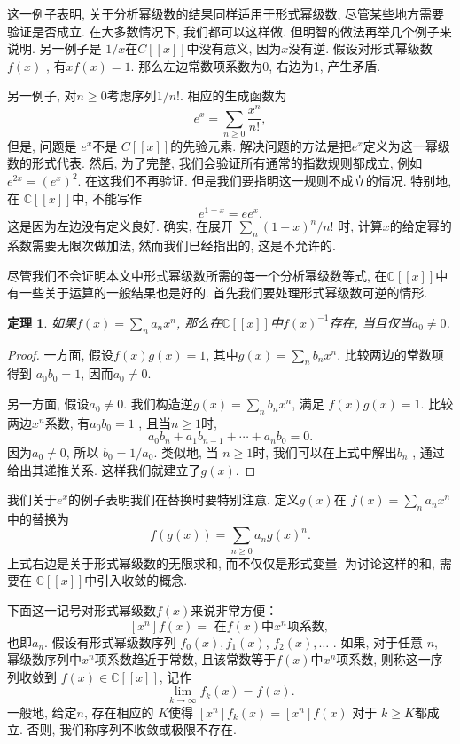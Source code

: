 \documentclass[a4paper,12pt]{ctexbook}
\newtheorem{theorem}[lemma]{\hspace{2em}定理}%
\begin{document}
这一例子表明, 关于分析幂级数的结果同样适用于形式幂级数, 尽管某些地方需要验证是否成立. 在大多数情况下, 我们都可以这样做. 但明智的做法再举几个例子来说明. 另一例子是 $1 / x$在$C[[x]]$中没有意义, 因为$x$没有逆. 假设对形式幂级数$f(x)$ , 有$x f(x)=1$. 那么左边常数项系数为0, 右边为1, 产生矛盾.

另一例子, 对$n \geq 0$考虑序列$1 / n !$. 相应的生成函数为
$$
e^{x}=\sum_{n \geq 0} \frac{x^{n}}{n !},
$$
但是, 问题是 $e^{x}$不是 $C[[x]]$的先验元素. 解决问题的方法是把$e^{x}$定义为这一幂级数的形式代表. 然后, 为了完整, 我们会验证所有通常的指数规则都成立, 例如 $e^{2 x}=\left(e^{x}\right)^{2}$. 在这我们不再验证. 但是我们要指明这一规则不成立的情况. 特别地, 在 $\mathbb{C}[[x]]$中, 不能写作
$$
e^{1+x}=e e^{x} .
$$
这是因为左边没有定义良好. 确实, 在展开 $\sum_{n}(1+x)^{n} / n !$ 时, 计算$x$的给定幂的系数需要无限次做加法, 然而我们已经指出的, 这是不允许的.

尽管我们不会证明本文中形式幂级数所需的每一个分析幂级数等式, 在$\mathbb{C}[[x]]$中有一些关于运算的一般结果也是好的. 首先我们要处理形式幂级数可逆的情形.

\begin{theorem}
	如果$f(x)=\sum_{n} a_{n} x^{n}$, 那么在$\mathbb{C}[[x]]$中$f(x)^{-1}$存在, 当且仅当$a_{0} \neq 0$.
\end{theorem}
\begin{proof}
	一方面, 假设$f(x) g(x)=1$, 其中$g(x)=\sum_{n} b_{n} x^{n} $. 比较两边的常数项得到 $a_{0} b_{0}=1$, 因而$a_{0} \neq 0$.

	另一方面, 假设$a_{0} \neq 0$. 我们构造逆$g(x)=\sum_{n} b_{n} x^{n}$, 满足 $f(x) g(x)=1$. 比较两边$x^{n}$系数, 有$a_{0} b_{0}=1$ , 且当$n \geq 1$时,
	$$
	a_{0} b_{n}+a_{1} b_{n-1}+\cdots+a_{n} b_{0}=0.
	$$
	因为$a_{0} \neq 0$, 所以 $b_{0}=1 / a_{0}$. 类似地, 当 $n \geq 1$时, 我们可以在上式中解出$b_{n}$ , 通过给出其递推关系. 这样我们就建立了$g(x)$.

\end{proof}

我们关于$e^{x}$的例子表明我们在替换时要特别注意. 定义$g(x)$在 $f(x)=\sum_{n} a_{n} x^{n}$中的{\kaishu 替换}为
$$
f(g(x))=\sum_{n \geq 0} a_{n} g(x)^{n} .
$$
上式右边是关于形式幂级数的无限求和, 而不仅仅是形式变量. 为讨论这样的和, 需要在 $\mathbb{C}[[x]]$中引入收敛的概念.

下面这一记号对形式幂级数$f(x)$来说非常方便：
$$
\left[x^{n}\right] f(x)=\text { 在$f(x)$中$x^{n}$项系数, }
$$
也即$a_{n}$. 假设有形式幂级数序列 $f_{0}(x), f_{1}(x)$, $f_{2}(x), \ldots$ . 如果, 对于任意 $n$, 幂级数序列中$x^{n}$项系数趋近于常数, 且该常数等于$f(x)$中$x^{n}$项系数, 则称这一序列收敛到 $f(x) \in \mathbb{C}[[x]]$, 记作
$$
\lim _{k \rightarrow \infty} f_{k}(x)=f(x).
$$
一般地, 给定$n$, 存在相应的 $K$使得  $\left[x^{n}\right] f_{k}(x)=\left[x^{n}\right] f(x)$ 对于 $k \geq K$都成立. 否则, 我们称序列不收敛或极限不存在.
\end{document}
